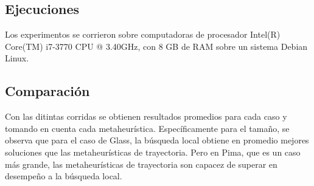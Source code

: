 \documentclass[11pt]{article}
\begin{document}
\begin{table}[h]
\caption{Parámetros usados en metaheurísticas}
\label{tabla:2}
\end{table}

\subsection{Ejecuciones}
Los experimentos se corrieron sobre computadoras de procesador Intel(R) Core(TM) i7-3770 CPU @ 3.40GHz, con 8 GB de RAM sobre un sistema Debian Linux.


\subsection{Comparación}

Con las ditintas corridas se obtienen resultados promedios para cada caso y tomando en cuenta cada metaheurística. Específicamente para el tamaño, se observa que para el caso de Glass, la búsqueda local obtiene en promedio mejores soluciones que las metaheurísticas de trayectoria. Pero en Pima, que es un caso más grande, las metaheurísticas de trayectoria son capacez de superar en desempeño a la búsqueda local.

\begin{table}[h]
\caption{Resultados para error de validación promedio con parámetros entonados}
\label{tabla:2}
\end{table}
\end{document}
